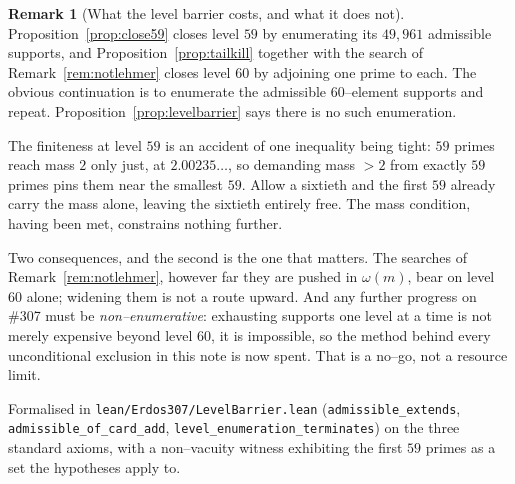 \documentclass[11pt]{article}
\theoremstyle{definition}
\newtheorem{remark}[theorem]{Remark}
\begin{document}
\begin{remark}[What the level barrier costs, and what it does not]\label{rem:levelbarrier}
Proposition~\ref{prop:close59} closes level $59$ by enumerating its $49{,}961$ admissible supports,
and Proposition~\ref{prop:tailkill} together with the search of Remark~\ref{rem:notlehmer} closes
level $60$ by adjoining one prime to each. The obvious continuation is to enumerate the admissible
$60$--element supports and repeat. Proposition~\ref{prop:levelbarrier} says there is no such
enumeration.

The finiteness at level $59$ is an accident of one inequality being tight: $59$ primes reach mass $2$
only just, at $2.00235\ldots$, so demanding mass $>2$ from exactly $59$ primes pins them near the
smallest $59$. Allow a sixtieth and the first $59$ already carry the mass alone, leaving the sixtieth
entirely free. The mass condition, having been met, constrains nothing further.

Two consequences, and the second is the one that matters. The searches of
Remark~\ref{rem:notlehmer}, however far they are pushed in $\omega(m)$, bear on level $60$ alone;
widening them is not a route upward. And any further progress on \#307 must be
\emph{non--enumerative}: exhausting supports one level at a time is not merely expensive beyond
level $60$, it is impossible, so the method behind every unconditional exclusion in this note is now
spent. That is a no--go, not a resource limit.

Formalised in \texttt{lean/Erdos307/LevelBarrier.lean} (\texttt{admissible\_extends},
\texttt{admissible\_of\_card\_add}, \texttt{level\_enumeration\_terminates}) on the three standard
axioms, with a non--vacuity witness exhibiting the first $59$ primes as a set the hypotheses apply
to.
\end{remark}
\end{document}
